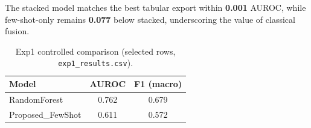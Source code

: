 The stacked model matches the best tabular export within \textbf{0.001} AUROC, while few-shot-only remains \textbf{0.077} below stacked, underscoring the value of classical fusion.

\begin{table}[htbp]
  \centering
  \caption{Exp1 controlled comparison (selected rows, \texttt{exp1\_results.csv}).}
  \label{tab:exp1c}
  \begin{tabular}{lcc}
    \toprule
    Model & AUROC & F1 (macro) \\
    \midrule
    RandomForest & 0.762 & 0.679 \\
    Proposed\_FewShot & 0.611 & 0.572 \\
    \bottomrule
  \end{tabular}
\end{table}
